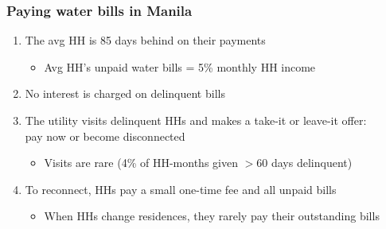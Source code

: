 \documentclass[aspectratio=149]{beamer}
\begin{document}
\begin{frame}
\frametitle{Paying water bills in Manila}

\begin{enumerate}


\item The avg HH is 85 days behind on their payments
  \begin{itemize}
    \item Avg HH's unpaid water bills = 5\% monthly HH income
  \end{itemize}
\vspace{3mm}

\item No interest is charged on delinquent bills 

\vspace{3mm}

\item The utility visits delinquent HHs and makes a take-it or leave-it offer: \\ pay now or become disconnected %
\vspace{.5mm}
  \begin{itemize}
    \item Visits are rare (4\% of HH-months given $>$60 days delinquent)
  \end{itemize}

\vspace{3mm}

\item To reconnect, HHs pay a small one-time fee and all unpaid bills
\vspace{.5mm}
  \begin{itemize}
    \item When HHs change residences, they rarely pay their outstanding bills 
  \end{itemize}

\end{enumerate}


\end{frame}
\end{document}
